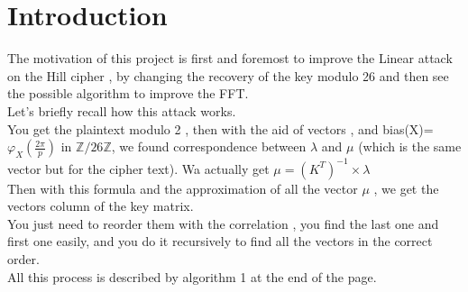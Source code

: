 \documentclass{article}
\begin{document}
\section{Introduction}
	The motivation of this project is first and foremost to improve the Linear attack on the Hill cipher , by changing the recovery of the key modulo 26 and then see the possible algorithm to improve the FFT.\\
Let's briefly recall how this attack works.\\
You get the plaintext modulo 2 , then with the aid of vectors , and bias(X)= $\varphi_{X}(\frac{2\pi}{p})$ in $\mathbb{Z}/26\mathbb{Z}$, we found correspondence between $\lambda$ and $\mu$ (which is the same vector but for the cipher text). Wa actually get $ \mu = (K^T)^{-1} \times\lambda $\\
Then with this formula and the approximation of all the vector $\mu$ , we get the vectors column of the key matrix.\\
You just need to reorder them with the correlation , you find the last one and first one easily, and you do it recursively to find all the vectors in the correct order.\\
All this process is described by algorithm 1 at the end of the page.\\
\end{document}
